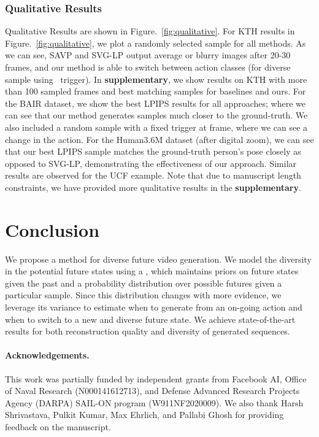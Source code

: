 \documentclass{article} \usepackage{iclr2021_conference,times}
\newcommand{\GP}{}
\begin{document}
\subsubsection{Qualitative Results}
\vspace{-0.05in}
Qualitative Results are shown in Figure.~\ref{fig:qualitative}. For KTH results in  Figure.~\ref{fig:qualitative}, we plot a randomly selected sample for all methods. As we can see, SAVP and SVG-LP output average or blurry images after 20-30 frames, and our method is able to switch between action classes (for diverse sample using \GP\ trigger). In \textbf{supplementary}, we show results on KTH with more than 100 sampled frames and best matching samples for baselines and ours. For the BAIR dataset, we show the best LPIPS results for all approaches; where we can see that our method generates samples much closer to the ground-truth. We also included a random sample with a fixed trigger at  frame, where we can see a change in the action. For the Human3.6M dataset (after digital zoom), we can see that our best LPIPS sample matches the ground-truth person's pose closely as opposed to SVG-LP, demonstrating the effectiveness of our approach. Similar results are observed for the UCF example. Note that due to manuscript length constraints, we have provided more qualitative results in the \textbf{supplementary}.




\vspace{-0.1in}
\section{Conclusion}
\vspace{-0.1in}
We propose a method for diverse future video generation. We model the diversity in the potential future states using a \GP, which maintains priors on future states given the past and a probability distribution over possible futures given a particular sample. Since this distribution changes with more evidence, we leverage its variance to estimate when to generate from an on-going action and when to switch to a new and diverse future state. We achieve state-of-the-art results for both reconstruction quality and diversity of generated sequences.

\paragraph{Acknowledgements.} This work was partially funded by independent grants from Facebook AI,  Office of Naval Research (N000141612713), and Defense Advanced Research Projects Agency (DARPA) SAIL-ON program (W911NF2020009). We also thank Harsh Shrivastava, Pulkit Kumar, Max Ehrlich, and Pallabi Ghosh for providing feedback on the manuscript.
\end{document}
